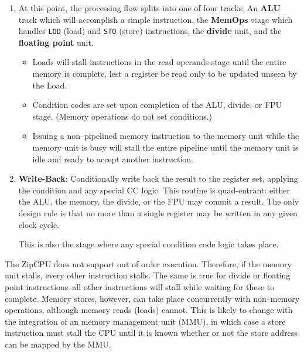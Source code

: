 \documentclass{gqtekspec}
\begin{document}
\begin{enumerate}
\item At this point, the processing flow splits into one of four tracks: An
	{\bf ALU} track which will accomplish a simple instruction, the
	{\bf MemOps} stage which handles {\tt LOD} (load) and {\tt STO}
	(store) instructions, the {\bf divide} unit, and the
	{\bf floating point} unit.
	\begin{itemize}
	\item Loads will stall instructions in the read operands stage until the
		entire memory is complete, lest a register be read only to be
		updated unseen by the Load.
	\item Condition codes are set upon completion of the ALU, divide,
		or FPU stage.  (Memory operations do not set conditions.)
	\item Issuing a non--pipelined memory instruction to the memory unit
		while the memory unit is busy will stall the entire pipeline
		until the memory unit is idle and ready to accept another
		instruction.
	\end{itemize}
\item {\bf Write-Back}: Conditionally write back the result to the register
	set, applying the condition and any special CC logic.  This routine is
	quad-entrant: either the ALU, the memory, the divide, or the FPU may
	commit a result.  The only design rule is that no more than a single
	register may be written in any given clock cycle.

	This is also the stage where any special condition code logic takes
	place.
\end{enumerate}

The ZipCPU does not support out of order execution.  Therefore, if the memory
unit stalls, every other instruction stalls.  The same is true for divide or
floating point instructions--all other instructions will stall while waiting
for these to complete.  Memory stores, however, can take place concurrently
with non--memory operations, although memory reads (loads) cannot.  This is
likely to change with the integration of an memory management unit (MMU), in which case a store
instruction must stall the CPU until it is known whether or not the store
address can be mapped by the MMU.

\end{document}
